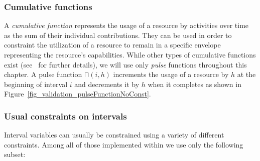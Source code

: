 \documentclass[main.tex]{subfiles}
\begin{document}
\subsubsection{Cumulative functions}
A \emph{cumulative function} represents the usage of a resource by activities over time as the sum of their individual contributions. They can be used in order to constraint the utilization of a resource to remain in a specific envelope representing the resource's capabilities. While other types of cumulative functions exist (see~\cite{Laborie08, Laborie09} for further details), we will use only \emph{pulse} functions throughout this chapter. A pulse function $\sqcap(i, h)$ increments the usage of a resource by $h$ at the beginning of interval $i$ and decrements it by $h$ when it completes as shown in Figure~\ref{fig_validation_pulseFunctionNoConst}.




\subsubsection{Usual constraints on intervals}
Interval variables can usually be constrained using a variety of different constraints. Among all of those implemented within \CPOpti we use only the following subset:
\end{document}
